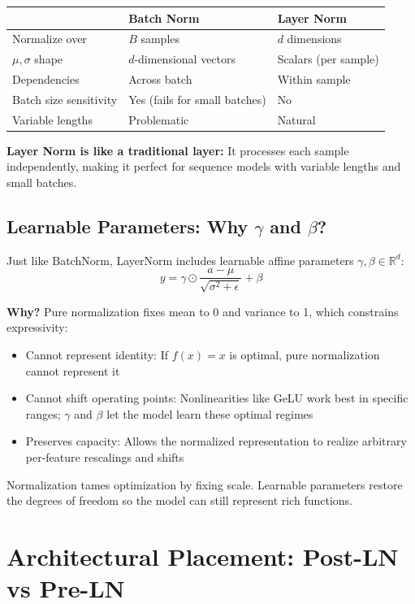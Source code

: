 \documentclass{article}
\begin{document}
\begin{tabular}{l|l|l}
& \textbf{Batch Norm} & \textbf{Layer Norm} \\
\hline
Normalize over & $B$ samples & $d$ dimensions \\
$\mu, \sigma$ shape & $d$-dimensional vectors & Scalars (per sample) \\
Dependencies & Across batch & Within sample \\
Batch size sensitivity & Yes (fails for small batches) & No \\
Variable lengths & Problematic & Natural \\
\end{tabular}

\textbf{Layer Norm is like a traditional layer:} It processes each sample independently, making it perfect for sequence models with variable lengths and small batches.

\subsection{Learnable Parameters: Why $\gamma$ and $\beta$?}

Just like BatchNorm, LayerNorm includes learnable affine parameters $\gamma, \beta \in \mathbb{R}^d$:
\[
y = \gamma \odot \frac{a - \mu}{\sqrt{\sigma^2 + \epsilon}} + \beta
\]

\textbf{Why?} Pure normalization fixes mean to 0 and variance to 1, which constrains expressivity:
\begin{itemize}
\item Cannot represent identity: If $f(x) = x$ is optimal, pure normalization cannot represent it
\item Cannot shift operating points: Nonlinearities like GeLU work best in specific ranges; $\gamma$ and $\beta$ let the model learn these optimal regimes
\item Preserves capacity: Allows the normalized representation to realize arbitrary per-feature rescalings and shifts
\end{itemize}

Normalization tames optimization by fixing scale. Learnable parameters restore the degrees of freedom so the model can still represent rich functions.

\section{Architectural Placement: Post-LN vs Pre-LN}
\end{document}
